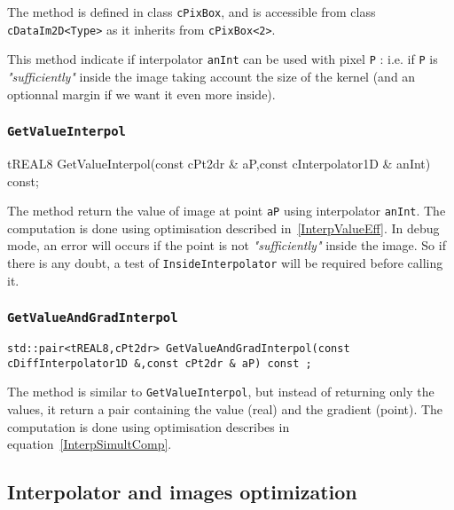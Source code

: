 The method is defined in class {\tt cPixBox}, and is accessible from class  {\tt cDataIm2D<Type>}
as it inherits from {\tt cPixBox<2>}.

This method indicate if  interpolator {\tt anInt} can be used with pixel {\tt P} : i.e. if {\tt P}
is \emph{"sufficiently"} inside the image taking account the size of the kernel (and an optionnal
margin if we want it even more inside).


\subsubsection{{\tt GetValueInterpol}}

{tREAL8 GetValueInterpol(const cPt2dr \& aP,const cInterpolator1D \& anInt) const;}

The method return the value of image at point {\tt aP} using interpolator {\tt anInt}. 
The computation is done using optimisation described in~\ref{InterpValueEff}.
In debug mode, an error will occurs if the point is not \emph{"sufficiently"} inside 
the image. So if there is any doubt, a test of {\tt InsideInterpolator} will be required before calling it.


\subsubsection{{\tt GetValueAndGradInterpol}}

{\tt std::pair<tREAL8,cPt2dr> GetValueAndGradInterpol(const cDiffInterpolator1D \&,const cPt2dr \& aP) const ;}

The method is similar to {\tt GetValueInterpol}, but instead of returning only the values, it 
return a pair containing the value (real) and the gradient (point).
The computation is done using optimisation describes in equation~\ref{InterpSimultComp}.



\subsection{Interpolator and images optimization}




